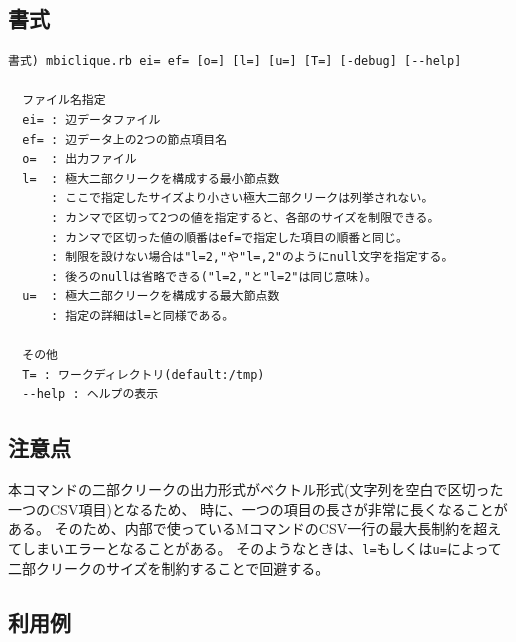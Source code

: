 \subsection{書式}
\begin{verbatim}
書式) mbiclique.rb ei= ef= [o=] [l=] [u=] [T=] [-debug] [--help]

  ファイル名指定
  ei= : 辺データファイル
  ef= : 辺データ上の2つの節点項目名
  o=  : 出力ファイル
  l=  : 極大二部クリークを構成する最小節点数
      : ここで指定したサイズより小さい極大二部クリークは列挙されない。
      : カンマで区切って2つの値を指定すると、各部のサイズを制限できる。
      : カンマで区切った値の順番はef=で指定した項目の順番と同じ。
      : 制限を設けない場合は"l=2,"や"l=,2"のようにnull文字を指定する。
      : 後ろのnullは省略できる("l=2,"と"l=2"は同じ意味)。
  u=  : 極大二部クリークを構成する最大節点数
      : 指定の詳細はl=と同様である。

  その他
  T= : ワークディレクトリ(default:/tmp)
  --help : ヘルプの表示
\end{verbatim}

\subsection{注意点}
本コマンドの二部クリークの出力形式がベクトル形式(文字列を空白で区切った一つのCSV項目)となるため、
時に、一つの項目の長さが非常に長くなることがある。
そのため、内部で使っているMコマンドのCSV一行の最大長制約を超えてしまいエラーとなることがある。
そのようなときは、\verb|l=|もしくは\verb|u=|によって二部クリークのサイズを制約することで回避する。

\subsection{利用例}


